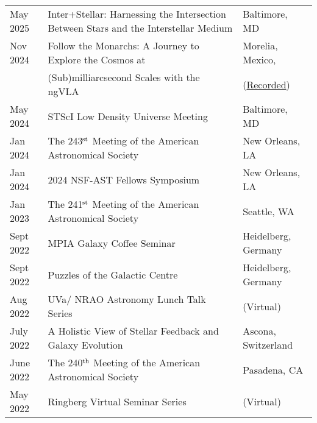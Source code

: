 \documentclass[11pt]{article}
\begin{document}
\begin{longtable}{p{} p{}p{}}

May 2025 & Inter+Stellar: Harnessing the Intersection Between Stars and the Interstellar Medium & {\small Baltimore, MD}\\

Nov 2024 & Follow the Monarchs: A Journey to Explore the Cosmos at  & {\small Morelia, Mexico,}\\
& (Sub)milliarcsecond Scales with the ngVLA & {\small(\href{https://youtu.be/CHdCz9VyqIM?si=kyrCyJ9LXm9UtWOj&t=3514}{Recorded})}\\

May 2024 & STScI Low Density Universe Meeting & {\small Baltimore, MD}\\

Jan 2024 & The 243$^{\rm st}$ Meeting of the American Astronomical Society & {\small New Orleans, LA}\\

Jan 2024 & 2024 NSF-AST Fellows Symposium & {\small New Orleans, LA}\\

Jan 2023 & The 241$^{\rm st}$ Meeting of the American Astronomical Society & {\small Seattle, WA}\\


Sept 2022 & MPIA Galaxy Coffee Seminar & {\small Heidelberg, Germany}\\

Sept 2022 & Puzzles of the Galactic Centre & {\small Heidelberg, Germany}\\

Aug 2022 & UVa/ NRAO Astronomy Lunch Talk Series & {\small (Virtual)}\\

July 2022 & A Holistic View of Stellar Feedback and Galaxy Evolution & {\small Ascona, Switzerland}\\

June  2022 &The 240$^{\rm th}$ Meeting of the American Astronomical Society & {\small Pasadena, CA}\\

May 2022 & Ringberg Virtual Seminar Series & {\small (Virtual)}\\



\end{longtable}
\end{document}

